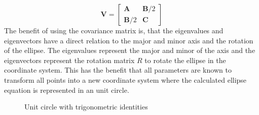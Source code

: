 \begin{equation}
    \mathbf{V} = \begin{bmatrix}
        \mathbf{A} & \mathbf{B}/2 \\
        \mathbf{B}/2 & \mathbf{C} 
    \label{covariance}
    \end{bmatrix}
\end{equation}
The benefit of using the covariance matrix is, that the eigenvalues and eigenvectors have a direct relation to the major and minor axis and the rotation of the ellipse. The eigenvalues represent the major and minor of the axis and the eigenvectors represent the rotation matrix $R$ to rotate the ellipse in the coordinate system. This has the benefit that all parameters are known to transform all points into a new coordinate system where the calculated ellipse equation is represented in an unit circle.

\begin{figure}[h]
    \centering
    \caption{Unit circle with trigonometric identities}
    \label{fig:unit_circle}
\end{figure}

